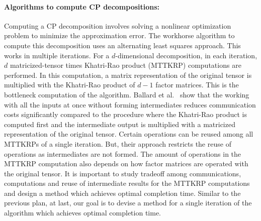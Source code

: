 \documentclass[a4paper,11pt]{article}
\newcommand{\bora}[1]{{\color{magenta} \emph{#1}}}
\newcommand{\sk}[1]{{\color{blue} \emph{#1}}}
\begin{document}

	
	
	\vspace*{-0.35cm}\paragraph{Algorithms to compute CP decompositions:}
	Computing a CP decomposition involves solving a nonlinear optimization problem to minimize the approximation error. The workhorse algorithm to compute this decomposition uses an alternating least squares approach. This works in multiple iterations. For a $d$-dimensional decomposition, in each iteration, $d$ matricized-tensor times Khatri-Rao product (MTTKRP) computations are performed. In this computation, a matrix representation of the original tensor is multiplied with the Khatri-Rao product of $d-1$ factor matrices. This is the bottleneck computation of the algorithm. 
	Ballard et al.~\cite{BNR-IPDPS-2018} show that the working
	with all the inputs at once without forming intermediates reduces communication costs significantly compared to the procedure where the Khatri-Rao product is computed first and the intermediate output is multiplied with a matricized representation of the original tensor. Certain operations can be reused among all MTTKRPs of a single iteration. But, their approach restricts the reuse of operations as intermediates are not formed. The amount of operations in the MTTKRP computation also depends on how factor matrices are operated with the original tensor.
	It is important to study tradeoff among communications, computations and reuse of intermediate results for the MTTKRP computations and design a method which achieves optimal completion time. Similar to the previous plan, at last, our goal is to devise a method for a single iteration of the algorithm which achieves optimal completion time.
	
\end{document}
